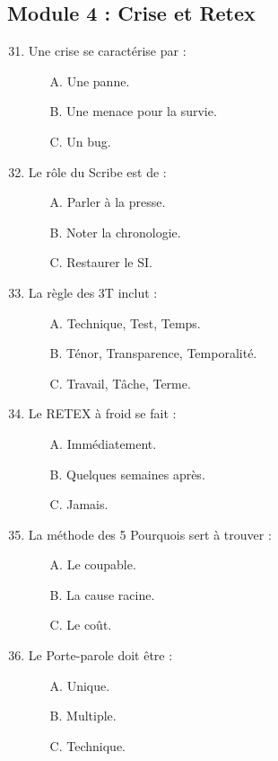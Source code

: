 \subsection*{Module 4 : Crise et Retex}
\begin{enumerate}
    \setcounter{enumi}{30}
    \item Une crise se caractérise par :
    \begin{itemize} \item[A.] Une panne. \item[B.] Une menace pour la survie. \item[C.] Un bug. \end{itemize}
    \item Le rôle du Scribe est de :
    \begin{itemize} \item[A.] Parler à la presse. \item[B.] Noter la chronologie. \item[C.] Restaurer le SI. \end{itemize}
    \item La règle des 3T inclut :
    \begin{itemize} \item[A.] Technique, Test, Temps. \item[B.] Ténor, Transparence, Temporalité. \item[C.] Travail, Tâche, Terme. \end{itemize}
    \item Le RETEX à froid se fait :
    \begin{itemize} \item[A.] Immédiatement. \item[B.] Quelques semaines après. \item[C.] Jamais. \end{itemize}
    \item La méthode des 5 Pourquois sert à trouver :
    \begin{itemize} \item[A.] Le coupable. \item[B.] La cause racine. \item[C.] Le coût. \end{itemize}
    \item Le Porte-parole doit être :
    \begin{itemize} \item[A.] Unique. \item[B.] Multiple. \item[C.] Technique. \end{itemize}

\end{enumerate}
